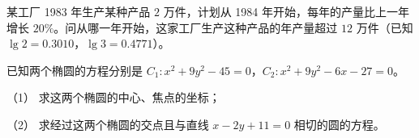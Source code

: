 \begin{question}
某工厂 1983 年生产某种产品 $2$ 万件，计划从 1984 年开始，每年的产量比上一年增长 $20\%$。问从哪一年开始，这家工厂生产这种产品的年产量超过 $12$ 万件（已知 $\lg 2=0.3010$，$\lg 3=0.4771$）。

\end{question}
\begin{question}
已知两个椭圆的方程分别是 $C_1:x^2+9y^2-45=0$，$C_2:x^2+9y^2-6x-27=0$。

（1） 求这两个椭圆的中心、焦点的坐标；

（2） 求经过这两个椭圆的交点且与直线 $x-2y+11=0$ 相切的圆的方程。

\end{question}